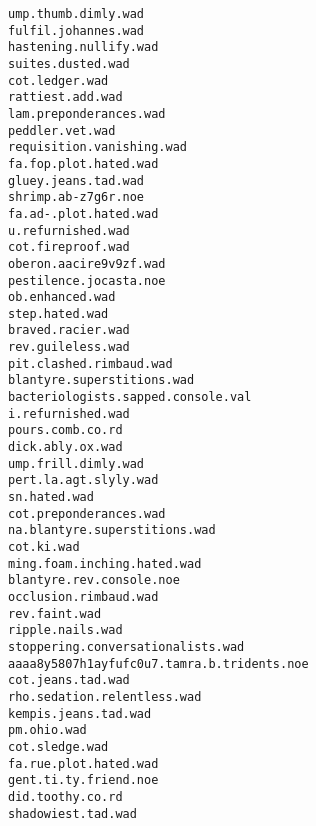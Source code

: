\documentclass{article} %
\begin{document}
\begin{verbatim}
ump.thumb.dimly.wad
fulfil.johannes.wad
hastening.nullify.wad
suites.dusted.wad
cot.ledger.wad
rattiest.add.wad
lam.preponderances.wad
peddler.vet.wad
requisition.vanishing.wad
fa.fop.plot.hated.wad
gluey.jeans.tad.wad
shrimp.ab-z7g6r.noe
fa.ad-.plot.hated.wad
u.refurnished.wad
cot.fireproof.wad
oberon.aacire9v9zf.wad
pestilence.jocasta.noe
ob.enhanced.wad
step.hated.wad
braved.racier.wad
rev.guileless.wad
pit.clashed.rimbaud.wad
blantyre.superstitions.wad
bacteriologists.sapped.console.val
i.refurnished.wad
pours.comb.co.rd
dick.ably.ox.wad
ump.frill.dimly.wad
pert.la.agt.slyly.wad
sn.hated.wad
cot.preponderances.wad
na.blantyre.superstitions.wad
cot.ki.wad
ming.foam.inching.hated.wad
blantyre.rev.console.noe
occlusion.rimbaud.wad
rev.faint.wad
ripple.nails.wad
stoppering.conversationalists.wad
aaaa8y5807h1ayfufc0u7.tamra.b.tridents.noe
cot.jeans.tad.wad
rho.sedation.relentless.wad
kempis.jeans.tad.wad
pm.ohio.wad
cot.sledge.wad
fa.rue.plot.hated.wad
gent.ti.ty.friend.noe
did.toothy.co.rd
shadowiest.tad.wad
\end{verbatim}
\end{document}
